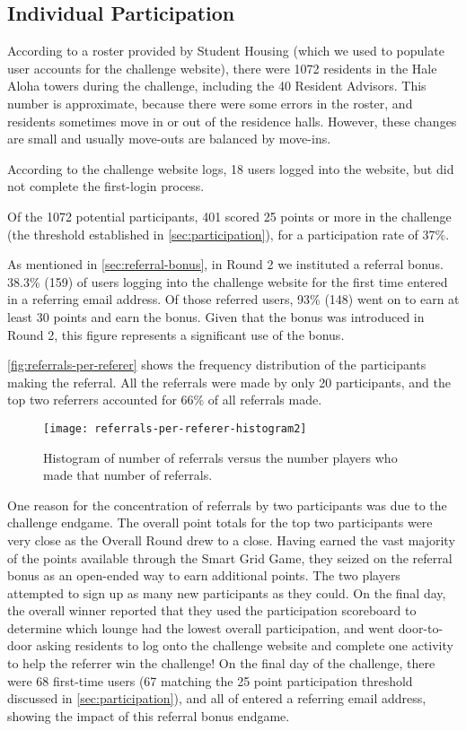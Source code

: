 \subsection{Individual Participation}
\label{sec:individual-participation}

According to a roster provided by Student Housing (which we used to populate user accounts for the challenge website), there were 1072 residents in the Hale Aloha towers during the challenge, including the 40 Resident Advisors. This number is approximate, because there were some errors in the roster, and residents sometimes move in or out of the residence halls. However, these changes are small and usually move-outs are balanced by move-ins.

According to the challenge website logs, 18 users logged into the website, but did not complete the first-login process.

Of the 1072 potential participants, 401 scored 25 points or more in the challenge (the threshold established in \autoref{sec:participation}), for a participation rate of 37\%.

As mentioned in \autoref{sec:referral-bonus}, in Round 2 we instituted a referral bonus. 38.3\% (159) of users logging into the challenge website for the first time entered in a referring email address. Of those referred users, 93\% (148) went on to earn at least 30 points and earn the bonus. Given that the bonus was introduced in Round 2, this figure represents a significant use of the bonus.

\autoref{fig:referrals-per-referer} shows the frequency distribution of the participants making the referral. All the referrals were made by only 20 participants, and the top two referrers accounted for 66\% of all referrals made.

\begin{figure}[htbp]
	\centering
	\texttt{[image: referrals-per-referer-histogram2]}
	\caption[Histogram of number of referrals versus the number players]{Histogram of number of referrals versus the number players who made that number of referrals.}
	\label{fig:referrals-per-referer}
\end{figure}

One reason for the concentration of referrals by two participants was due to the challenge endgame. The overall point totals for the top two participants were very close as the Overall Round drew to a close. Having earned the vast majority of the points available through the Smart Grid Game, they seized on the referral bonus as an open-ended way to earn additional points. The two players attempted to sign up as many new participants as they could. On the final day, the overall winner reported that they used the participation scoreboard to determine which lounge had the lowest overall participation, and went door-to-door asking residents to log onto the challenge website and complete one activity to help the referrer win the challenge! On the final day of the challenge, there were 68 first-time users (67 matching the 25 point participation threshold discussed in \autoref{sec:participation}), and all of entered a referring email address, showing the impact of this referral bonus endgame.

